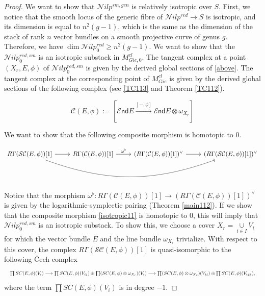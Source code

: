 \documentclass[11pt]{amsart}
\newcommand {\End} {\mathcal E\mathsf{nd}}
\theoremstyle{plain}
\numberwithin{equation}{section}
\theoremstyle{definition}
\theoremstyle{plain}
\begin{document}
\begin{proof}
 We want to show that $\mathcal Nilp^{sm,gen}$ is relatively isotropic over $S$. First, we notice that the smooth locus of the generic fibre of $\mathcal Nilp^{red}\longrightarrow S$ is isotropic, and its dimension is equal to $n^2(g-1)$, which is the same as the dimension of the stack of rank $n$ vector bundles on a smooth projective curve of genus $g$. Therefore, we have $ \dim \mathcal Nilp^{red}_0\geq n^2(g-1)$. We want to show that the $\mathcal Nilp^{red,sm}_0$ is an isotropic substack in $M^{cl}_{Gie,0}$. The tangent complex at a point $(X_r, E, \phi)$ of $\mathcal Nilp^{red, sm}_0$ is given by the derived global sections of \eqref{above}. The tangent complex at the corresponding point of $M^{cl}_{Gie}$ is given by the derived global sections of the following complex (see \eqref{TC113} and Theorem \ref{TC112}). 

\begin{equation}
\mathcal {C}{(E, \phi)}:=[\End E\xrightarrow{[-, \phi]} \End E\otimes \omega_{X_r}]
\end{equation}

We want to show that the following composite morphism is homotopic to $0$. 
\begin{small}
\begin{equation}\label{isotropic11}
\begin{tikzcd}
    R\Gamma(\mathcal {SC}(E, \phi))[1]\arrow{r} \arrow[bend right=20]{rrr} & R\Gamma(\mathcal {C}(E, \phi))[1]\arrow{r}{\omega^{\flat}} & (R\Gamma(\mathcal {C}( E, \phi))[1])^{\vee}\arrow{r} & (R\Gamma(\mathcal {SC}( E, \phi))[1])^{\vee}
\end{tikzcd} 
\end{equation}
\end{small}
Notice that the morphism $\omega^{\flat}: R\Gamma(\mathcal {C}(E, \phi))[1]\to (R\Gamma(\mathcal {C}(E, \phi))[1])^{\vee}$ is given by the logarithmic-symplectic pairing (Theorem \ref{main112}). If we show that the composite morphism \eqref{isotropic11} is homotopic to $0$, this will imply that $\mathcal Nilp^{red, sm}_0$ is an isotropic substack. To show this, we choose a cover $X_r=\underset{i\in I}\cup V_i$ for which the vector bundle $E$ and the line bundle $\omega_{X_r}$ trivialize. With respect to this cover, the complex $R\Gamma(\mathcal {SC}(E, \phi))[1]$ is quasi-isomorphic to the following \v{C}ech complex
\begin{equation}
 \resizebox{1.00\hsize}{!}{$\prod SC( E,\phi)(V_i)\longrightarrow \prod SC( E,\phi)(V_{ij})\oplus \prod(SC(E,\phi)\otimes \omega_{X_r} )({V_i}) \longrightarrow \prod(SC( E,\phi)\otimes \omega_{X_r} )(V_{ij})\oplus \prod SC(E,\phi)(V_{ijk})$,}
\end{equation}
where the term $\prod SC(E,\phi)({V_i})$ is in degree $-1$. 


\end{proof}
\end{document}
